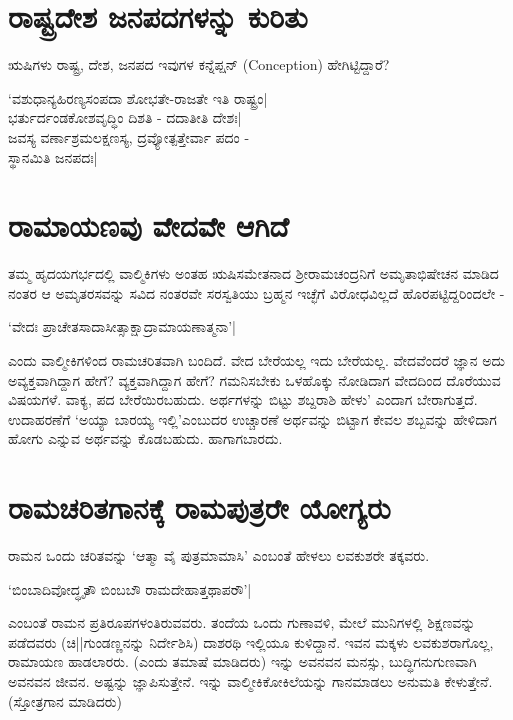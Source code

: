 \section*{ರಾಷ್ಟ್ರದೇಶ ಜನಪದಗಳನ್ನು ಕುರಿತು}

ಋಷಿಗಳು ರಾಷ್ಟ್ರ, ದೇಶ, ಜನಪದ ಇವುಗಳ ಕನ್ನೆಪ್ಷನ್ ({\eng Conception}) ಹೇಗಿಟ್ಟಿದ್ದಾರೆ?

\begin{shloka}
`ವಶುಧಾನ್ಯಹಿರಣ್ಯಸಂಪದಾ ಶೋಭತೇ-ರಾಜತೇ ಇತಿ ರಾಷ್ಟ್ರಂ|\\
ಭರ್ತುರ್ದಂಡಕೋಶವೃದ್ಧಿಂ ದಿಶತಿ - ದದಾತೀತಿ ದೇಶಃ|\\
ಜವಸ್ಯ ವರ್ಣಾಶ್ರಮಲಕ್ಷಣಸ್ಯ, ದ್ರವ್ಯೋತ್ಪತ್ತೇರ್ವಾ ಪದಂ -\\
ಸ್ಥಾನಮಿತಿ ಜನಪದಃ|
\end{shloka}

\section*{ರಾಮಾಯಣವು ವೇದವೇ ಆಗಿದೆ}

ತಮ್ಮ ಹೃದಯಗರ್ಭದಲ್ಲಿ ವಾಲ್ಮಿಕಿಗಳು ಅಂತಹ ಋಷಿಸಮೇತನಾದ ಶ್ರೀರಾಮಚಂದ್ರನಿಗೆ ಅಮೃತಾಭಿಷೇಚನ ಮಾಡಿದ ನಂತರ ಆ ಅಮೃತರಸವನ್ನು ಸವಿದ ನಂತರವೇ ಸರಸ್ವತಿಯು ಬ್ರಹ್ಮನ ಇಚ್ಛೆಗೆ ವಿರೋಧವಿಲ್ಲದೆ ಹೊರಪಟ್ಟಿದ್ದರಿಂದಲೇ -

\begin{shloka}
`ವೇದಃ ಪ್ರಾಚೇತಸಾದಾಸೀತ್ಸಾಕ್ಷಾದ್ರಾಮಾಯಣಾತ್ಮನಾ'|
\end{shloka}
ಎಂದು ವಾಲ್ಮೀಕಿಗಳಿಂದ ರಾಮಚರಿತವಾಗಿ ಬಂದಿದೆ. ವೇದ ಬೇರೆಯಲ್ಲ ಇದು ಬೇರೆಯಲ್ಲ. ವೇದವೆಂದರೆ ಜ್ಞಾನ ಅದು ಅವ್ಯಕ್ತವಾಗಿದ್ದಾಗ ಹೇಗೆ? ವ್ಯಕ್ತವಾಗಿದ್ದಾಗ ಹೇಗೆ? ಗಮನಿಸಬೇಕು ಒಳಹೊಕ್ಕು ನೋಡಿದಾಗ ವೇದದಿಂದ ದೊರೆಯುವ ವಿಷಯಗಳೆ. ವಾಕ್ಯ, ಪದ ಬೇರೆಯಿರಬಹುದು. ಅರ್ಥಗಳನ್ನು ಬಿಟ್ಟು ಶಬ್ದರಾಶಿ ಹೇಳು' ಎಂದಾಗ ಬೇರಾಗುತ್ತದೆ. ಉದಾಹರಣೆಗೆ `ಅಯ್ಯಾ ಬಾರಯ್ಯ ಇಲ್ಲಿ'ಎಂಬುದರ ಉಚ್ಚಾರಣೆ ಅರ್ಥವನ್ನು ಬಿಟ್ಟಾಗ ಕೇವಲ ಶಬ್ಬವನ್ನು ಹೇಳಿದಾಗ ಹೋಗು ಎನ್ನುವ ಅರ್ಥವನ್ನು ಕೊಡಬಹುದು. ಹಾಗಾಗಬಾರದು.

\section*{ರಾಮಚರಿತಗಾನಕ್ಕೆ ರಾಮಪುತ್ರರೇ ಯೋಗ್ಯರು}

ರಾಮನ ಒಂದು ಚರಿತವನ್ನು `ಆತ್ಮಾ ವೈ ಪುತ್ರಮಾಮಾಸಿ' ಎಂಬಂತೆ ಹೇಳಲು ಲವಕುಶರೇ ತಕ್ಕವರು.

\begin{shloka}
`ಬಿಂಬಾದಿವೋದ್ಧೃತೌ ಬಿಂಬಬೌ ರಾಮದೇಹಾತ್ತಥಾಪರೌ'|
\end{shloka}
ಎಂಬಂತೆ ರಾಮನ ಪ್ರತಿರೂಪಗಳಂತಿರುವವರು. ತಂದೆಯ ಒಂದು ಗುಣಾವಳಿ, ಮೇಲೆ ಮುನಿಗಳಲ್ಲಿ ಶಿಕ್ಷಣವನ್ನು ಪಡೆದವರು (ಚಿ||ಗುಂಡಣ್ಣನನ್ನು ನಿರ್ದೇಶಿಸಿ) ದಾಶರಥಿ ಇಲ್ಲಿಯೂ ಕುಳಿದ್ದಾನೆ. ಇವನ ಮಕ್ಕಳು ಲವಕುಶರಾಗೊಲ್ಲ, ರಾಮಾಯಣ ಹಾಡಲಾರರು. (ಎಂದು ತಮಾಷೆ ಮಾಡಿದರು) ಇನ್ನು ಅವನವನ ಮನಸ್ಸು, ಬುದ್ಧಿಗನುಗುಣವಾಗಿ ಅವನವನ ಜೀವನ. ಅಷ್ಟನ್ನು ಜ್ಞಾಪಿಸುತ್ತೇನೆ. ಇನ್ನು ವಾಲ್ಮೀಕಿಕೋಕಿಲೆಯನ್ನು ಗಾನಮಾಡಲು ಅನುಮತಿ ಕೇಳುತ್ತೇನೆ. (ಸ್ತೋತ್ರಗಾನ ಮಾಡಿದರು)

